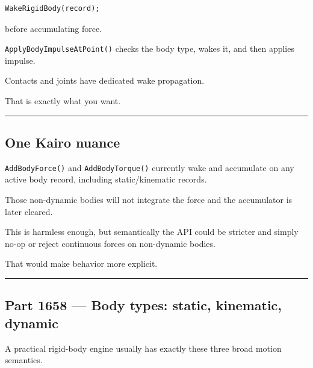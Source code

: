 \begin{verbatim}
WakeRigidBody(record);
\end{verbatim}

before accumulating force.

\texttt{ApplyBodyImpulseAtPoint()} checks the body type, wakes it, and then applies impulse.

Contacts and joints have dedicated wake propagation.

That is exactly what you want.

\begin{center}\rule{0.5\linewidth}{0.5pt}\end{center}

\subsection{One Kairo nuance}\label{06-engine-ii-ch037-one-kairo-nuance}

\hypertarget{06-engine-ii-ch037-one-kairo-nuance}{}

\texttt{AddBodyForce()} and \texttt{AddBodyTorque()} currently wake and accumulate on any active body record, including static/kinematic records.

Those non-dynamic bodies will not integrate the force and the accumulator is later cleared.

This is harmless enough, but semantically the API could be stricter and simply no-op or reject continuous forces on non-dynamic bodies.

That would make behavior more explicit.

\begin{center}\rule{0.5\linewidth}{0.5pt}\end{center}

\subsection{Part 1658 --- Body types: static, kinematic, dynamic}\label{06-engine-ii-ch037-part-1658-body-types-static-kinematic-dynamic}

\hypertarget{06-engine-ii-ch037-part-1658-body-types-static-kinematic-dynamic}{}

A practical rigid-body engine usually has exactly these three broad motion semantics.

